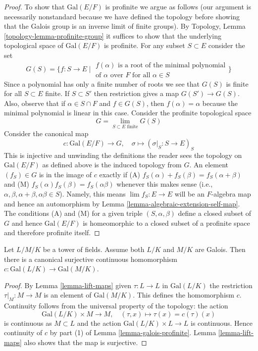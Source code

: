 \begin{proof}
\medskip\noindent
To show that $\text{Gal}(E/F)$ is profinite we argue as follows
(our argument is necessarily nonstandard because we have defined
the topology before showing that the Galois group is an inverse
limit of finite groups).
By Topology, Lemma \ref{topology-lemma-profinite-group}
it suffices to show that the underlying
topological space of $\text{Gal}(E/F)$ is profinite.
For any subset $S \subset E$ consider the set
$$
G(S) = \{ f : S \to E \mid
\begin{matrix}
f(\alpha)\text{ is a root of the minimal polynomial}\\
\text{of }\alpha\text{ over }F\text{ for all }\alpha \in S
\end{matrix}
\}
$$
Since a polynomial has only a finite number of roots we see that
$G(S)$ is finite for all $S \subset E$ finite. If $S \subset S'$
then restriction gives a map $G(S') \to G(S)$. Also, observe
that if $\alpha \in S \cap F$ and $f \in G(S)$, then $f(\alpha) = \alpha$
because the minimal polynomial is linear in this case.
Consider the profinite topological space
$$
G = \lim_{S \subset E\text{ finite}} G(S)
$$
Consider the canonical map
$$
c : \text{Gal}(E/F) \longrightarrow G,\quad
\sigma \longmapsto (\sigma|_S : S \to E)_S
$$
This is injective and unwinding the definitions the
reader sees the topology on $\text{Gal}(E/F)$ as defined above
is the induced topology from $G$. An element $(f_S) \in G$ is in
the image of $c$ exactly if
(A) $f_S(\alpha) + f_S(\beta) = f_S(\alpha + \beta)$ and
(M) $f_S(\alpha)f_S(\beta) = f_S(\alpha\beta)$ whenever
this makes sense (i.e., 
$\alpha, \beta, \alpha + \beta, \alpha\beta \in S$).
Namely, this means
$\lim f_S : E \to E$ will be an $F$-algebra map
and hence an automorphism by
Lemma \ref{lemma-algebraic-extension-self-map}.
The conditions (A) and (M) for a given triple
$(S, \alpha, \beta)$ define a closed subset of
$G$ and hence $\text{Gal}(E/F)$ is homeomorphic
to a closed subset of a profinite space and therefore
profinite itself.
\end{proof}

\begin{lemma}
\label{lemma-galois-infinite}
Let $L/M/K$ be a tower of fields. Assume both $L/K$ and
$M/K$ are Galois. Then there is a canonical surjective continuous
homomorphism $c : \text{Gal}(L/K) \to \text{Gal}(M/K)$.
\end{lemma}

\begin{proof}
By Lemma \ref{lemma-lift-maps} given $\tau : L \to L$ in
$\text{Gal}(L/K)$ the restriction $\tau|_M : M \to M$
is an element of $\text{Gal}(M/K)$. This defines the homomorphism $c$.
Continuity follows from the universal property of the topology:
the action
$$
\text{Gal}(L/K) \times M \longrightarrow M,\quad
(\tau, x) \longmapsto \tau(x) = c(\tau)(x)
$$
is continuous as $M \subset L$ and the action
$\text{Gal}(L/K) \times L \to L$ is continuous.
Hence continuity of $c$ by part (1) of
Lemma \ref{lemma-galois-profinite}.
Lemma \ref{lemma-lift-maps} also
shows that the map is surjective.
\end{proof}

